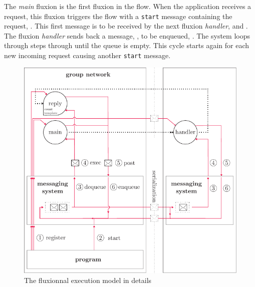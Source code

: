 
The \textit{main} fluxion is the first fluxion in the flow.
When the application receives a request, this fluxion triggers the flow with a \texttt{start} message containing the request, .
This first message is to be received by the next fluxion \textit{handler},  and .
The fluxion \textit{handler} sends back a message, , to be enqueued, .
The system loops through steps  through  until the queue is empty.
This cycle starts again for each new incoming request causing another \texttt{start} message.

\begin{figure}[h!]
  \includegraphics[width=\linewidth]{resources/schema-message.pdf}
  \caption{The fluxionnal execution model in details}
  \label{fig:MesSys}
\end{figure}


